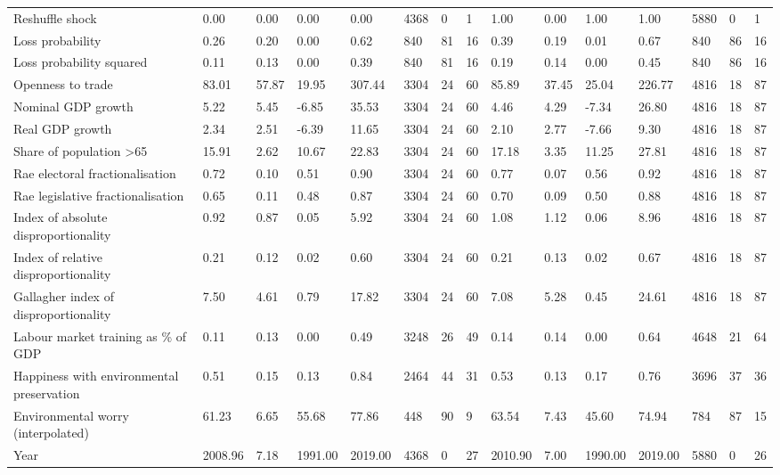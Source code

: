 \begin{longtable}{lllllllllllllll}
Reshuffle shock & 0.00 & 0.00 & 0.00 & 0.00 & 4368 & 0 & 1 & 1.00 & 0.00 & 1.00 & 1.00 & 5880 & 0 & 1\\
Loss probability & 0.26 & 0.20 & 0.00 & 0.62 & 840 & 81 & 16 & 0.39 & 0.19 & 0.01 & 0.67 & 840 & 86 & 16\\
\addlinespace
Loss probability squared & 0.11 & 0.13 & 0.00 & 0.39 & 840 & 81 & 16 & 0.19 & 0.14 & 0.00 & 0.45 & 840 & 86 & 16\\
Openness to trade & 83.01 & 57.87 & 19.95 & 307.44 & 3304 & 24 & 60 & 85.89 & 37.45 & 25.04 & 226.77 & 4816 & 18 & 87\\
Nominal GDP growth & 5.22 & 5.45 & -6.85 & 35.53 & 3304 & 24 & 60 & 4.46 & 4.29 & -7.34 & 26.80 & 4816 & 18 & 87\\
Real GDP growth & 2.34 & 2.51 & -6.39 & 11.65 & 3304 & 24 & 60 & 2.10 & 2.77 & -7.66 & 9.30 & 4816 & 18 & 87\\
Share of population >65 & 15.91 & 2.62 & 10.67 & 22.83 & 3304 & 24 & 60 & 17.18 & 3.35 & 11.25 & 27.81 & 4816 & 18 & 87\\
\addlinespace
Rae electoral fractionalisation & 0.72 & 0.10 & 0.51 & 0.90 & 3304 & 24 & 60 & 0.77 & 0.07 & 0.56 & 0.92 & 4816 & 18 & 87\\
Rae legislative fractionalisation & 0.65 & 0.11 & 0.48 & 0.87 & 3304 & 24 & 60 & 0.70 & 0.09 & 0.50 & 0.88 & 4816 & 18 & 87\\
Index of absolute disproportionality & 0.92 & 0.87 & 0.05 & 5.92 & 3304 & 24 & 60 & 1.08 & 1.12 & 0.06 & 8.96 & 4816 & 18 & 87\\
Index of relative disproportionality & 0.21 & 0.12 & 0.02 & 0.60 & 3304 & 24 & 60 & 0.21 & 0.13 & 0.02 & 0.67 & 4816 & 18 & 87\\
Gallagher index of disproportionality & 7.50 & 4.61 & 0.79 & 17.82 & 3304 & 24 & 60 & 7.08 & 5.28 & 0.45 & 24.61 & 4816 & 18 & 87\\
\addlinespace
Labour market training as \% of GDP & 0.11 & 0.13 & 0.00 & 0.49 & 3248 & 26 & 49 & 0.14 & 0.14 & 0.00 & 0.64 & 4648 & 21 & 64\\
Happiness with environmental preservation & 0.51 & 0.15 & 0.13 & 0.84 & 2464 & 44 & 31 & 0.53 & 0.13 & 0.17 & 0.76 & 3696 & 37 & 36\\
Environmental worry (interpolated) & 61.23 & 6.65 & 55.68 & 77.86 & 448 & 90 & 9 & 63.54 & 7.43 & 45.60 & 74.94 & 784 & 87 & 15\\
Year & 2008.96 & 7.18 & 1991.00 & 2019.00 & 4368 & 0 & 27 & 2010.90 & 7.00 & 1990.00 & 2019.00 & 5880 & 0 & 26\\
\bottomrule
\end{longtable}
